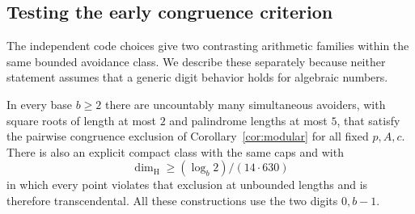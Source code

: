\subsection{Testing the early congruence criterion}
The independent code choices give two contrasting arithmetic families within the same bounded avoidance class. We describe these separately because neither statement assumes that a generic digit behavior holds for algebraic numbers.

\begin{proposition}\label{prop:modtest}
In every base $b\ge2$ there are uncountably many simultaneous avoiders, with square roots of length at most $2$ and palindrome lengths at most $5$, that satisfy the pairwise congruence exclusion of Corollary~\ref{cor:modular} for all fixed $p,A,c$. There is also an explicit compact class with the same caps and with
\[
 \dim_{\mathrm H}\ge (\log_b 2)/(14\cdot630)
\]
in which every point violates that exclusion at unbounded lengths and is therefore transcendental. All these constructions use the two digits $0,b-1$.
\end{proposition}

